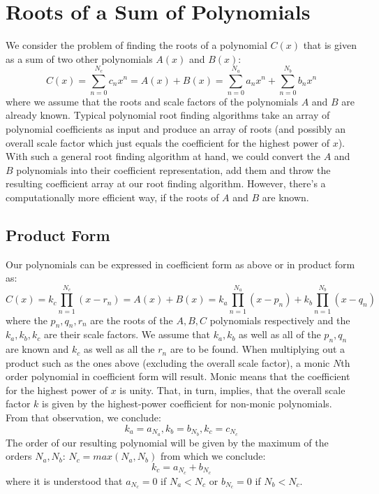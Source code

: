 \section{Roots of a Sum of Polynomials}

We consider the problem of finding the roots of a polynomial $C(x)$ that is given as a sum of two other polynomials $A(x)$ and $B(x)$:
\begin{equation}
  C(x) = \sum_{n=0}^{N_c} c_n x^n = A(x) + B(x) = \sum_{n=0}^{N_a} a_n x^n + \sum_{n=0}^{N_b} b_n x^n
\end{equation}
where we assume that the roots and scale factors of the polynomials $A$ and $B$ are already known. Typical polynomial root finding algorithms take an array of polynomial coefficients as input and produce an array of roots (and possibly an overall scale factor which just equals the coefficient for the highest power of $x$). With such a general root finding algorithm at hand, we could convert the $A$ and $B$ polynomials into their coefficient representation, add them and throw the resulting coefficient array at our root finding algorithm. However, there's a computationally more efficient way, if the roots of $A$ and $B$ are known.

\subsection{Product Form}
Our polynomials can be expressed in coefficient form as above or in product form as:
\begin{equation}
\label{Eq:ProductForm}
  C(x) = k_c \prod_{n=1}^{N_c} (x - r_n) = A(x) + B(x) = k_a \prod_{n=1}^{N_a} (x - p_n) + k_b \prod_{n=1}^{N_b} (x - q_n)
\end{equation}
where the $p_n, q_n, r_n$ are the roots of the $A, B, C$ polynomials respectively and the $k_a, k_b, k_c$ are their scale factors. We assume that $k_a, k_b$ as well as all of the $p_n, q_n$ are known and $k_c$ as well as all the $r_n$ are to be found. When multiplying out a product such as the ones above (excluding the overall scale factor), a monic $N$th order polynomial in coefficient form will result. Monic means that the coefficient for the highest power of $x$ is unity. That, in turn, implies, that the overall scale factor $k$ is given by the highest-power coefficient for non-monic polynomials. From that observation, we conclude:
\begin{equation}
  k_a = a_{N_a}, k_b = b_{N_b}, k_c = c_{N_c}
\end{equation}
The order of our resulting polynomial will be given by the maximum of the orders $N_a, N_b$: $N_c = max(N_a, N_b)$
from which we conclude:
\begin{equation}
\boxed
{
  k_c = a_{N_c} + b_{N_c}
}
\end{equation}
where it is understood that $a_{N_c} = 0$ if $N_a < N_c$ or $b_{N_c} = 0$ if $N_b < N_c$.

